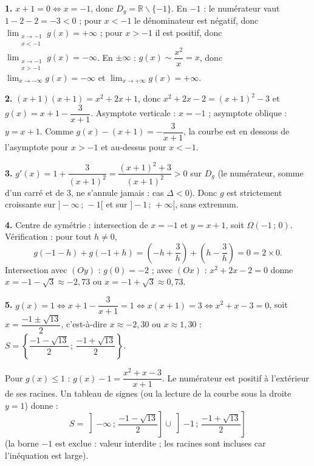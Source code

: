 \documentclass[11pt]{article}
\def\setminus{\mathbin{\backslash}}\let\smallsetminus\setminus
\begin{document}
\begin{corrige}
\textbf{1.} $x + 1 = 0 \iff x = -1$, donc $D_g = \mathbb{R} \setminus \{-1\}$. En $-1$ : le numérateur vaut $1 - 2 - 2 = -3 < 0$ ; pour $x < -1$ le dénominateur est négatif, donc $\displaystyle\lim_{\substack{x \to -1 \\ x < -1}} g(x) = +\infty$ ; pour $x > -1$ il est positif, donc $\displaystyle\lim_{\substack{x \to -1 \\ x > -1}} g(x) = -\infty$. En $\pm\infty$ : $g(x) \sim \dfrac{x^2}{x} = x$, donc $\displaystyle\lim_{x \to -\infty} g(x) = -\infty$ et $\displaystyle\lim_{x \to +\infty} g(x) = +\infty$.

\textbf{2.} $(x+1)(x+1) = x^2 + 2x + 1$, donc $x^2 + 2x - 2 = (x+1)^2 - 3$ et $g(x) = x + 1 - \dfrac{3}{x+1}$. Asymptote verticale : $x = -1$ ; asymptote oblique : $y = x + 1$. Comme $g(x) - (x+1) = -\dfrac{3}{x+1}$, la courbe est en dessous de l'asymptote pour $x > -1$ et au-dessus pour $x < -1$.

\textbf{3.} $g'(x) = 1 + \dfrac{3}{(x+1)^2} = \dfrac{(x+1)^2 + 3}{(x+1)^2} > 0$ sur $D_g$ (le numérateur, somme d'un carré et de $3$, ne s'annule jamais : cas $\Delta < 0$). Donc $g$ est strictement croissante sur $]-\infty\,;\,-1[$ et sur $]-1\,;\,+\infty[$, sans extremum.

\textbf{4.} Centre de symétrie : intersection de $x = -1$ et $y = x+1$, soit $\Omega(-1\,;\,0)$. Vérification : pour tout $h \neq 0$,
\[ g(-1-h) + g(-1+h) = \left(-h + \frac{3}{h}\right) + \left(h - \frac{3}{h}\right) = 0 = 2 \times 0. \]
Intersection avec $(Oy)$ : $g(0) = -2$ ; avec $(Ox)$ : $x^2 + 2x - 2 = 0$ donne $x = -1 - \sqrt{3} \approx -2{,}73$ ou $x = -1 + \sqrt{3} \approx 0{,}73$.

\textbf{5.} $g(x) = 1 \iff x + 1 - \dfrac{3}{x+1} = 1 \iff x(x+1) = 3 \iff x^2 + x - 3 = 0$, soit $x = \dfrac{-1 \pm \sqrt{13}}{2}$, c'est-à-dire $x \approx -2{,}30$ ou $x \approx 1{,}30$ : $S = \left\{\dfrac{-1-\sqrt{13}}{2}\,;\,\dfrac{-1+\sqrt{13}}{2}\right\}$.

Pour $g(x) \leq 1$ : $g(x) - 1 = \dfrac{x^2+x-3}{x+1}$. Le numérateur est positif à l'extérieur de ses racines. Un tableau de signes (ou la lecture de la courbe sous la droite $y = 1$) donne :
\[ S = \left]-\infty\,;\,\frac{-1-\sqrt{13}}{2}\right] \cup \left]-1\,;\,\frac{-1+\sqrt{13}}{2}\right] \]
(la borne $-1$ est exclue : valeur interdite ; les racines sont incluses car l'inéquation est large).
\end{corrige}
\end{document}
